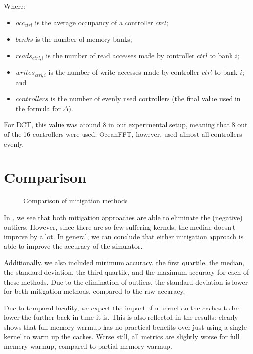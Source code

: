 Where:
\begin{itemize}
    \item $occ_{ctrl}$ is the average occupancy of a controller $ctrl$;
    \item $banks$ is the number of memory banks;
    \item $reads_{ctrl, i}$ is the number of read accesses made by controller $ctrl$ to bank $i$;
    \item $writes_{ctrl, i}$ is the number of write accesses made by controller $ctrl$ to bank $i$; and
    \item $controllers$ is the number of evenly used controllers (the final value used in the formula for $\Delta$).
\end{itemize}

For DCT, this value was around 8 in our experimental setup, meaning that 8 out of the 16 controllers were used.
OceanFFT, however, used almost all controllers evenly.

\FloatBarrier
\section{Comparison}\label{sec:sim-vs-corr}
\begin{figure}[h]
    \centering
    \caption{Comparison of mitigation methods}
    \label{fig:mitig-compare}
\end{figure}

In , we see that both mitigation approaches are able to eliminate the (negative) outliers.
However, since there are so few suffering kernels, the median doesn't improve by a lot.
In general, we can conclude that either mitigation approach is able to improve the accuracy of the simulator.

Additionally, we also included minimum accuracy, the first quartile, the median, the standard deviation, the third quartile, and the maximum accuracy for each of these methods.
Due to the elimination of outliers, the standard deviation is lower for both mitigation methods, compared to the raw accuracy.

Due to temporal locality, we expect the impact of a kernel on the caches to be lower the further back in time it is.
This is also reflected in the results:  clearly shows that full memory warmup has no practical benefits over just using a single kernel to warm up the caches.
Worse still, all metrics are slightly worse for full memory warmup, compared to partial memory warmup.

